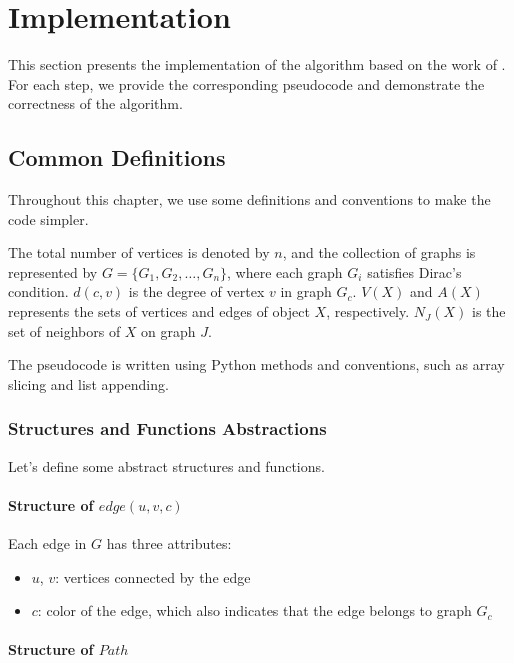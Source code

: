 
\chapter{Implementation}

This section presents the implementation of the algorithm based on the work of \cite{Joos_2020}. For each step, we provide the corresponding pseudocode and demonstrate the correctness of the algorithm.

\section{Common Definitions}


Throughout this chapter, we use some definitions and conventions to make the code simpler.

The total number of vertices is denoted by $n$, and the collection of 
graphs is represented by $G = \{G_1, G_2, \dots, G_n\}$, where each graph $G_i$ 
satisfies Dirac's condition. $d(c, v)$ is the degree of vertex $v$ in graph $G_c$.
$V(X)$ and $A(X)$ represents the sets of vertices and edges of object $X$, respectively. $N_J(X)$ is the set of neighbors of $X$ on graph $J$.

The pseudocode is written using Python methods and conventions, such as array slicing and 
list appending.

\subsection{Structures and Functions Abstractions}


Let's define some abstract structures and functions.

\subsubsection{Structure of $edge(u, v, c)$}

Each edge in $G$ has three attributes:

\begin{itemize}
    \item $u$, $v$: vertices connected by the edge
    \item $c$: color of the edge, which also indicates that the edge belongs to graph $G_c$
\end{itemize}

\subsubsection{Structure of $Path$}

